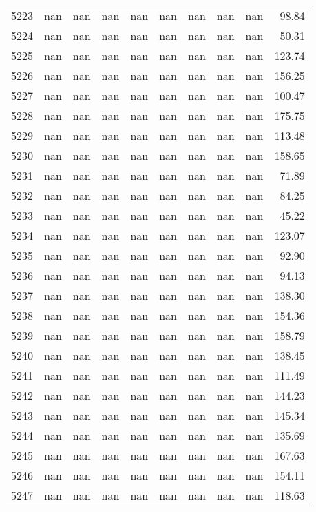 \begin{tabular}{lrrrrrrrrr}
5223 & nan & nan & nan & nan & nan & nan & nan & nan & 98.84 \\
5224 & nan & nan & nan & nan & nan & nan & nan & nan & 50.31 \\
5225 & nan & nan & nan & nan & nan & nan & nan & nan & 123.74 \\
5226 & nan & nan & nan & nan & nan & nan & nan & nan & 156.25 \\
5227 & nan & nan & nan & nan & nan & nan & nan & nan & 100.47 \\
5228 & nan & nan & nan & nan & nan & nan & nan & nan & 175.75 \\
5229 & nan & nan & nan & nan & nan & nan & nan & nan & 113.48 \\
5230 & nan & nan & nan & nan & nan & nan & nan & nan & 158.65 \\
5231 & nan & nan & nan & nan & nan & nan & nan & nan & 71.89 \\
5232 & nan & nan & nan & nan & nan & nan & nan & nan & 84.25 \\
5233 & nan & nan & nan & nan & nan & nan & nan & nan & 45.22 \\
5234 & nan & nan & nan & nan & nan & nan & nan & nan & 123.07 \\
5235 & nan & nan & nan & nan & nan & nan & nan & nan & 92.90 \\
5236 & nan & nan & nan & nan & nan & nan & nan & nan & 94.13 \\
5237 & nan & nan & nan & nan & nan & nan & nan & nan & 138.30 \\
5238 & nan & nan & nan & nan & nan & nan & nan & nan & 154.36 \\
5239 & nan & nan & nan & nan & nan & nan & nan & nan & 158.79 \\
5240 & nan & nan & nan & nan & nan & nan & nan & nan & 138.45 \\
5241 & nan & nan & nan & nan & nan & nan & nan & nan & 111.49 \\
5242 & nan & nan & nan & nan & nan & nan & nan & nan & 144.23 \\
5243 & nan & nan & nan & nan & nan & nan & nan & nan & 145.34 \\
5244 & nan & nan & nan & nan & nan & nan & nan & nan & 135.69 \\
5245 & nan & nan & nan & nan & nan & nan & nan & nan & 167.63 \\
5246 & nan & nan & nan & nan & nan & nan & nan & nan & 154.11 \\
5247 & nan & nan & nan & nan & nan & nan & nan & nan & 118.63 \\

\end{tabular}
